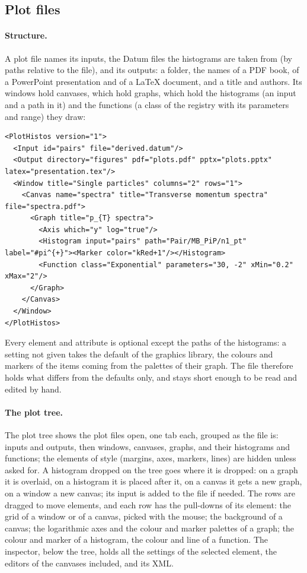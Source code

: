 \subsection{Plot files}
\label{sec:plotfiles}

\paragraph{Structure.}
A plot file names its inputs, the Datum files the histograms are taken from (by paths relative to the file), and its
outputs: a folder, the names of a PDF book, of a PowerPoint presentation and of a \LaTeX{} document, and a title and
authors. Its windows hold canvases, which hold graphs, which hold the histograms (an input and a path in it) and the
functions (a class of the registry with its parameters and range) they draw:
\begin{widetext}
{\footnotesize
\begin{verbatim}
<PlotHistos version="1">
  <Input id="pairs" file="derived.datum"/>
  <Output directory="figures" pdf="plots.pdf" pptx="plots.pptx" latex="presentation.tex"/>
  <Window title="Single particles" columns="2" rows="1">
    <Canvas name="spectra" title="Transverse momentum spectra" file="spectra.pdf">
      <Graph title="p_{T} spectra">
        <Axis which="y" log="true"/>
        <Histogram input="pairs" path="Pair/MB_PiP/n1_pt" label="#pi^{+}"><Marker color="kRed+1"/></Histogram>
        <Function class="Exponential" parameters="30, -2" xMin="0.2" xMax="2"/>
      </Graph>
    </Canvas>
  </Window>
</PlotHistos>
\end{verbatim}}
\end{widetext}
\noindent Every element and attribute is optional except the paths of the histograms: a setting not given takes the
default of the graphics library, the colours and markers of the items coming from the palettes of their graph. The
file therefore holds what differs from the defaults only, and stays short enough to be read and edited by hand.

\paragraph{The plot tree.}
The plot tree shows the plot files open, one tab each, grouped as the file is: inputs and outputs, then windows,
canvases, graphs, and their histograms and functions; the elements of style (margins, axes, markers, lines) are
hidden unless asked for. A histogram dropped on the tree goes where it is dropped: on a graph it is overlaid, on a
histogram it is placed after it, on a canvas it gets a new graph, on a window a new canvas; its input is added to the
file if needed. The rows are dragged to move elements, and each row has the pull-downs of its element: the grid of a
window or of a canvas, picked with the mouse; the background of a canvas; the logarithmic axes and the colour and
marker palettes of a graph; the colour and marker of a histogram, the colour and line of a function. The inspector,
below the tree, holds all the settings of the selected element, the editors of the canvases included, and its XML.

